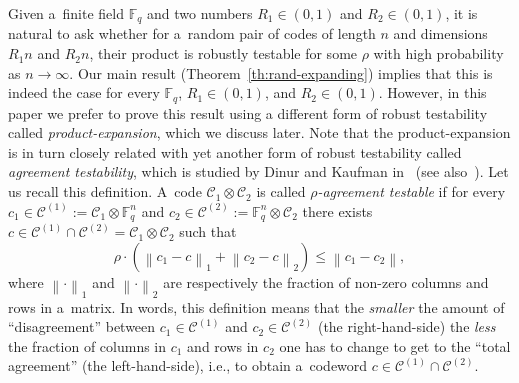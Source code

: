 \documentclass[11pt]{article}
\let\le\leqslant
\theoremstyle{plain}
\theoremstyle{definition}
\theoremstyle{remark}
\newcommand{\norm}[1]{\left\lVert#1\right\rVert}
\newcommand{\cC}{\mathcal{C}}
\newcommand{\F}{\mathbb{F}}
\begin{document}
Given a~finite field $\F_q$ and two numbers $R_1\in (0,1)$ and $R_2\in (0,1)$, it is natural to ask whether for a~random pair of codes of length $n$ and dimensions $R_1 n$ and $R_2 n$, their product is robustly testable for some $\rho$ with high probability as $n\to\infty$. Our main result (Theorem~\ref{th:rand-expanding}) implies that this is indeed the case for every $\F_q$, $R_1\in (0,1)$, and $R_2\in (0,1)$. However, in this paper we prefer to prove this result using a different form of robust testability called \emph{product-expansion}, which we discuss later. Note that the product-expansion is in turn  closely related with yet another form of robust testability called \emph{agreement testability}, which is studied by Dinur and Kaufman in~\cite{Dinur:2017} (see also~\cite[Definition~2.8]{Dinur:stoc2022}). 
Let us recall this definition. A~code $\cC_1\otimes \cC_2$ is called \emph{$\rho$-agreement testable} if 
for every $c_1\in \cC^{(1)}:=\cC_1\otimes \F_q^{n}$ and $c_2\in  \cC^{(2)}:=\F_q^{n}\otimes \cC_2$ there exists $c\in\cC^{(1)}\cap\cC^{(2)} = \cC_1 \otimes \cC_2$ such that 
\begin{equation}\label{eqn:agreement}
    \rho\cdot (\norm{c_1 - c}_1 + \norm{c_2 - c}_2) \le \norm{c_1 - c_2},
\end{equation}
where $\norm{\cdot}_1$ and $\norm{\cdot}_2$ are respectively the fraction of non-zero columns and rows in a~matrix. In words, this definition means that the \emph{smaller} the amount of ``disagreement'' between $c_1\in \cC^{(1)}$ and $c_2\in\cC^{(2)}$ (the right-hand-side) the \emph{less} the fraction of columns in $c_1$ and rows in $c_2$ one has to change to get to the ``total agreement'' (the left-hand-side), i.e., to obtain a~codeword  $c\in\cC^{(1)}\cap\cC^{(2)}$.
\end{document}
